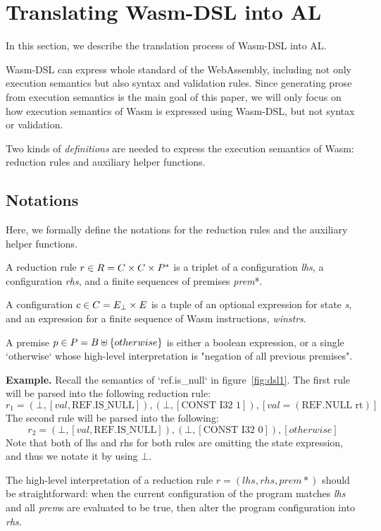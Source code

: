 \section{Translating Wasm-DSL into AL}\label{sec:translate}

In this section, we describe the translation process of Wasm-DSL into AL.

Wasm-DSL can express whole standard of the WebAssembly, including not only
execution semantics but also syntax and validation rules.
Since generating prose from execution semantics is the main goal of this paper,
we will only focus on how execution semantics of Wasm is expressed using Wasm-DSL, but not syntax or validation.

Two kinds of \textit{definitions} are needed to express the execution semantics of Wasm:
reduction rules and auxiliary helper functions.

\subsection{Notations}
Here, we formally define the notations for the reduction rules and the auxiliary helper functions.

A reduction rule $r \in R = C \times C \times P^\ast$ is a triplet of a
configuration \textit{lhs}, a configuration \textit{rhs}, and a finite sequences of premises \textit{prem}*.

A configuration $c \in C = E_\bot \times E$ is a tuple of an optional expression for state \textit{s},
and an expression for a finite sequence of Wasm instructions, \textit{winstrs}.

A premise $p \in P = B \uplus \{otherwise\}$ is either a boolean expression, or a
single `otherwise` whose high-level interpretation is "negation of all previous premises".

\textbf{Example.} Recall the semantics of `ref.is\_null` in figure~\ref{fig:dsl1}.
The first rule will be parsed into the following reduction rule:
\[r_1=(\bot, [val, \text{REF.IS\_NULL}]), (\bot, [\text{CONST I32 1}]), [val = (\text{REF.NULL rt})]\]
The second rule will be parsed into the following:
\[r_2=(\bot, [val, \text{REF.IS\_NULL}]), (\bot, [\text{CONST I32 0}]), [otherwise]\]
Note that both of lhs and rhs for both rules are omitting the state expression,
and thus we notate it by using $\bot$.

The high-level interpretation of a reduction rule $r = (lhs, rhs, prem*)$ should be straightforward:
when the current configuration of the program matches \textit{lhs} and all \textit{prem}s are
evaluated to be true, then alter the program configuration into \textit{rhs}.

